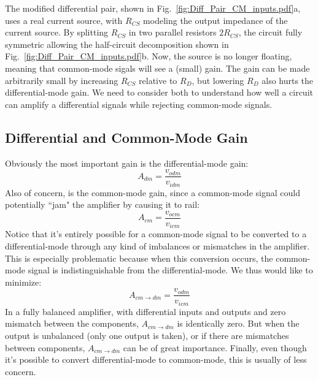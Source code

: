 The modified differential pair, shown in Fig.~\ref{fig:Diff_Pair_CM_inputs.pdf}a, uses a real current source, with $R_{CS}$ modeling the output impedance of the current source.  By splitting $R_{CS}$ in two parallel resistors $2R_{CS}$, the circuit fully symmetric allowing the half-circuit decomposition shown in Fig.~\ref{fig:Diff_Pair_CM_inputs.pdf}b.  Now, the source is no longer floating, meaning that common-mode sigals will see a (small) gain.  The gain can be made arbitrarily small by increasing $R_{CS}$ relative to $R_D$, but lowering $R_D$ also hurts the differential-mode gain.  We need to consider both to understand how well a circuit can amplify a differential signals while rejecting common-mode signals.
\subsection{Differential and Common-Mode Gain}
Obviously the most important gain is the differential-mode gain:
\begin{equation}
	A_{dm} = \frac{v_{odm}}{v_{idm}}
\end{equation}
Also of concern, is the common-mode gain, since a common-mode signal could potentially ``jam" the amplifier by causing it to rail:
\begin{equation}
	A_{cm} = \frac{v_{ocm}}{v_{icm}}
\end{equation}
Notice that it's entirely possible for a common-mode signal to be converted to a differential-mode through any kind of imbalances or mismatches in the amplifier.  This is especially problematic because when this conversion occurs, the common-mode signal is indistinguishable from the differential-mode.  We thus would like to minimize:
\begin{equation}
	A_{cm \to dm} = \frac{v_{odm}}{v_{icm}}
\end{equation}
In a fully balanced amplifier, with differential inputs and outputs and zero mismatch between the components, $A_{cm \to dm}$ is identically zero.  But when the output is unbalanced (only one output is taken), or if there are mismatches between components, $A_{cm \to dm}$ can be of great importance.  Finally, even though it's possible to convert differential-mode to common-mode, this is usually of less concern.  
